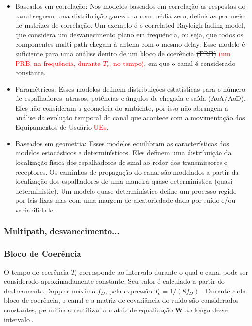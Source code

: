 \begin{itemize}
  \item Baseados em correlação: Nos modelos baseados em correlação as respostas do canal seguem uma distribuição gaussiana com média zero, definidas por meio de matrizes de correlação. Um exemplo é o correlated Rayleigh fading model, que considera um desvanecimento plano em frequência, ou seja, que todos os componentes multi-path chegam à antena com o mesmo delay. Esse modelo é suficiente para uma análise dentro de um bloco de coerência \sout{(PRB)} \textcolor{red}{(um PRB, na frequência, durante $T_c$, no tempo)}, em que o canal é considerado constante.
  \item Paramétricos: Esses modelos definem distribuições estatísticas para o número de espalhadores,  atrasos, potências e ângulos de chegada e saída (AoA/AoD). Eles não consideram a geometria do ambiente, por isso não abrangem a análise da evolução temporal do canal que acontece com a movimentação dos \sout{Equipamentos de Usuário} \textcolor{red}{UEs}.
  \item Baseados em geometria: Esses modelos equilibram as características dos modelos estocásticos e determinísticos. Eles definem uma distribuição da localização física dos espalhadores de sinal ao redor dos transmissores e receptores. Os caminhos de propagação do canal são modelados a partir da localização dos espalhadores de uma maneira quase-determinística (quasi-deterministic). Um modelo quase-determinístico define um processo regido por leis fixas mas com uma margem de aleatoriedade dada por ruído e/ou variabilidade. 
\end{itemize} 

\subsubsection{Multipath, desvanecimento...}
\subsubsection{Bloco de Coerência}\label{subsec:bloco-coerencia}
O tempo de coerência \(T_c\) corresponde ao intervalo durante o qual o canal pode ser considerado aproximadamente constante. Seu valor é calculado a partir do deslocamento Doppler máximo \(f_D\), pela expressão \(T_c=1/(8f_D)\) \cite{tse-viswanath}. Durante cada bloco de coerência, o canal e a matriz de covariância do ruído são considerados constantes, permitindo reutilizar a matriz de equalização \(\mathbf W\) ao longo desse intervalo \cite{zhao2025jsac}.

